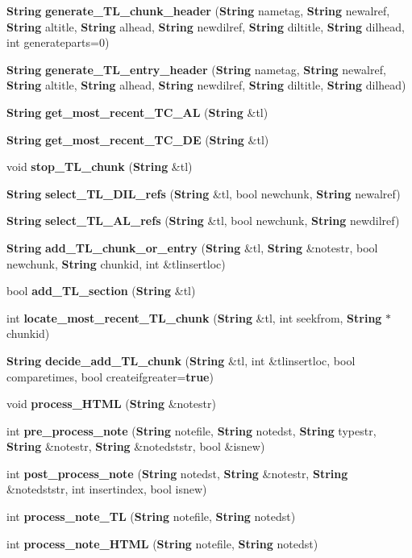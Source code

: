 \begin{CompactItemize}
\item 
{\bf String} {\bf generate\_\-TL\_\-chunk\_\-header} ({\bf String} nametag, {\bf String} newalref, {\bf String} altitle, {\bf String} alhead, {\bf String} newdilref, {\bf String} diltitle, {\bf String} dilhead, int generateparts=0)
\item 
{\bf String} {\bf generate\_\-TL\_\-entry\_\-header} ({\bf String} nametag, {\bf String} newalref, {\bf String} altitle, {\bf String} alhead, {\bf String} newdilref, {\bf String} diltitle, {\bf String} dilhead)
\item 
{\bf String} {\bf get\_\-most\_\-recent\_\-TC\_\-AL} ({\bf String} \&tl)
\item 
{\bf String} {\bf get\_\-most\_\-recent\_\-TC\_\-DE} ({\bf String} \&tl)
\item 
void {\bf stop\_\-TL\_\-chunk} ({\bf String} \&tl)
\item 
{\bf String} {\bf select\_\-TL\_\-DIL\_\-refs} ({\bf String} \&tl, bool newchunk, {\bf String} newalref)
\item 
{\bf String} {\bf select\_\-TL\_\-AL\_\-refs} ({\bf String} \&tl, bool newchunk, {\bf String} newdilref)
\item 
{\bf String} {\bf add\_\-TL\_\-chunk\_\-or\_\-entry} ({\bf String} \&tl, {\bf String} \&notestr, bool newchunk, {\bf String} chunkid, int \&tlinsertloc)
\item 
bool {\bf add\_\-TL\_\-section} ({\bf String} \&tl)
\item 
int {\bf locate\_\-most\_\-recent\_\-TL\_\-chunk} ({\bf String} \&tl, int seekfrom, {\bf String} $\ast$chunkid)
\item 
{\bf String} {\bf decide\_\-add\_\-TL\_\-chunk} ({\bf String} \&tl, int \&tlinsertloc, bool comparetimes, bool createifgreater={\bf true})
\item 
void {\bf process\_\-HTML} ({\bf String} \&notestr)
\item 
int {\bf pre\_\-process\_\-note} ({\bf String} notefile, {\bf String} notedst, {\bf String} typestr, {\bf String} \&notestr, {\bf String} \&notedststr, bool \&isnew)
\item 
int {\bf post\_\-process\_\-note} ({\bf String} notedst, {\bf String} \&notestr, {\bf String} \&notedststr, int insertindex, bool isnew)
\item 
int {\bf process\_\-note\_\-TL} ({\bf String} notefile, {\bf String} notedst)
\item 
int {\bf process\_\-note\_\-HTML} ({\bf String} notefile, {\bf String} notedst)
\item 

\end{CompactItemize}
